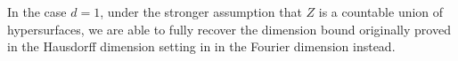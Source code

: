 \documentclass[12pt,reqno]{article}
\numberwithin{equation}{section}
\DeclareMathOperator{\fordim}{\dim_{\mathbf{F}}}
\DeclareMathOperator{\RR}{\mathbf{R}}
\DeclareMathOperator{\ZZ}{\mathbf{Z}}
\numberwithin{theorem}{section}
\begin{document}
\begin{comment}
A well-known result in this pattern avoidance setting is that sets with large Fourier dimension satisfy many algebraic relations. More precisely, if integer coefficients $m_1, \dots, m_n \in \ZZ$ are fixed, and we consider a compact set $X \subset \RR$ with $\fordim(X) > 2/n$, then the sum set $m_1 X + \dots + m_n X$ contains an open interval. It follows by a slight modification of these coefficients that if $X \subset \RR$ and $\fordim(X) > 2/n$, then there exists $m_1, \dots, m_n \in \ZZ$, distinct points $x_1, \dots, x_n \in X$, and an additional integer $a \in \ZZ$, such that
%
\begin{equation} \label{intequation}
    m_1 x_1 + \dots + m_n x_n = a.
\end{equation}
%
It is an interesting to determine how tight this result is. In \cite{Korner2}, T.W. K\"{o}rner constructs a Salem set $X$ with Fourier dimension $1/(n-1)$ such that for non-zero $m \in \ZZ^n$, and $a \in \ZZ$, $X$ does not contain distinct points $x_1, \dots, x_n$ solving \eqref{intequation}. If, for each nonzero $m \in \ZZ^n$ and $a \in \ZZ$, we consider the set
%
\[ Z_{m,a} = \left\{ (x_1, \dots, x_n) \in [0,1]^n : m_1x_1 + \dots + m_n x_n = a \right\}, \]
%
then $Z_{m,a}$ is a subset of an $n-1$ dimensional hyperplane, and thus can be easily seen to have Minkowski dimension $n-1$. It follows that we can apply Theorem \ref{maintheorem} to $Z = \bigcup \{ Z_{m,a} : m \neq 0, a \in \ZZ \}$ to obtain a Salem set $X \subset [0,1]$ with dimension
%
\[ \frac{n - (n-1)}{n - 1} = \frac{1}{n-1}, \]
%
such that $(x_1, \dots, x_n) \not \in Z$ for each distinct $x_1, \dots, x_n \in X$. This means precisely that $X$ avoids solutions to $\eqref{intequation}$ for all nonzero $m \in \ZZ^n$ and $a \in \ZZ$. Thus we see Theorem \ref{maintheorem} generalizes K\"{o}rner's result, and thus shows the result depends little on the arithmetic properties of the pattern K\"{o}rner avoids, but rather, depends only on the `thickness' of the family of tuples $(x_1, \dots, x_n)$ satisfying the pattern. Since we expect Theorem \ref{maintheorem} to be tight for general sets, an improvement to K\"{o}rner's construction must rely more heavily on the algebraic properties of the pattern involved.
\end{comment}

In the case $d = 1$, under the stronger assumption that $Z$ is a countable union of hypersurfaces, we are able to fully recover the dimension bound originally proved in the Hausdorff dimension setting in \cite{PramanikFraser} in the Fourier dimension instead.
\end{document}
